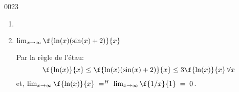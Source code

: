 \begin{corrige}{0023}
\begin{alternative}
\begin{enumerate}
		\item 

		  \item $\lim_{x\rightarrow \infty} \f{\ln(x)(\sin(x)+2)}{x}$
		 
		 Par la règle de l'étau:\[\f{\ln(x)}{x} \leq \f{\ln(x)(\sin(x)+2)}{x} \leq 3\f{\ln(x)}{x} \, \forall x\]
		 et, $\lim_{x\rightarrow \infty} \f{\ln(x)}{x} \; =^H \; \lim_{x\rightarrow \infty} \f{1/x}{1}  \;=\;0$.
		 
	\end{enumerate}
\end{alternative}

\end{corrige}
